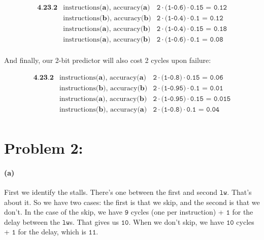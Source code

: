 \documentclass[a4paper]{article}
\begin{document}
\begin{equation}
\begin{array}{rll}
\textbf{4.23.2} &  \mbox{instructions} \textbf{(a)} \mbox{, accuracy} \textbf{(a)} & \texttt{2} \cdot \texttt{(1-0.6)} \cdot \texttt{0.15 = 0.12} \\[.05in]
&  \mbox{instructions} \textbf{(b)} \mbox{, accuracy} \textbf{(b)} & \texttt{2} \cdot \texttt{(1-0.4)} \cdot \texttt{0.1 = 0.12} \\[.05in]
&  \mbox{instructions} \textbf{(a)} \mbox{, accuracy} \textbf{(b)} & \texttt{2} \cdot \texttt{(1-0.4)} \cdot \texttt{0.15 = 0.18} \\[.05in]
&  \mbox{instructions} \textbf{(a)} \mbox{, accuracy} \textbf{(b)} & \texttt{2} \cdot \texttt{(1-0.6)} \cdot \texttt{0.1 = 0.08} \\[.05in]
\end{array}
\end{equation}

And finally, our 2-bit predictor will also cost 2 cycles upon failure:

\begin{equation}
\begin{array}{rll}
\textbf{4.23.2} & \mbox{instructions} \textbf{(a)} \mbox{, accuracy} \textbf{(a)} & \texttt{2} \cdot \texttt{(1-0.8)} \cdot \texttt{0.15 = 0.06} \\[.05in]
& \mbox{instructions} \textbf{(b)} \mbox{, accuracy} \textbf{(b)} & \texttt{2} \cdot \texttt{(1-0.95)} \cdot \texttt{0.1 = 0.01} \\[.05in]
& \mbox{instructions} \textbf{(a)} \mbox{, accuracy} \textbf{(b)} & \texttt{2} \cdot \texttt{(1-0.95)} \cdot \texttt{0.15 = 0.015} \\[.05in]
& \mbox{instructions} \textbf{(b)} \mbox{, accuracy} \textbf{(a)} & \texttt{2} \cdot \texttt{(1-0.8)} \cdot \texttt{0.1 = 0.04} \\[.05in]
\end{array}
\end{equation}

\section*{Problem 2:}

\paragraph{(a)}

First we identify the stalls. There's one between the first and second $\texttt{lw}$. That's about it. So we have two cases: the first is that we skip, and the second is that we don't. In the case of the skip, we have $\texttt{9}$ cycles (one per instruction) + $\texttt{1}$ for the delay between the $\texttt{lw}$s. That gives us $\texttt{10}$. When we don't skip, we have $\texttt{10}$ cycles + $\texttt{1}$ for the delay, which is $\texttt{11}$.
\end{document}
